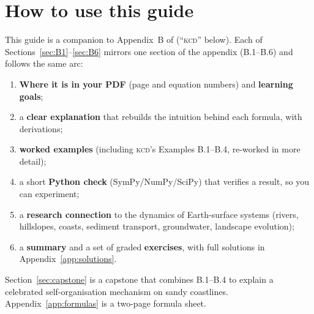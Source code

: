 \documentclass[11pt,letterpaper]{article}
\numberwithin{equation}{section}
\newcommand{\Kundu}{\textnormal{\textsc{kcd}}}   %
\begin{document}
\section*{How to use this guide}

This guide is a companion to Appendix~B of \citet{kundu2016} (``\Kundu'' below). Each of
Sections~\ref{sec:B1}--\ref{sec:B6} mirrors one section of the appendix (B.1--B.6) and follows the same arc:
\begin{enumerate}[label=\arabic*.,leftmargin=2em]
  \item \textbf{Where it is in your PDF} (page and equation numbers) and \textbf{learning goals};
  \item a \textbf{clear explanation} that rebuilds the intuition behind each formula, with derivations;
  \item \textbf{worked examples} (including \Kundu's Examples B.1--B.4, re-worked in more detail);
  \item a short \textbf{Python check} (SymPy/NumPy/SciPy) that verifies a result, so you can experiment;
  \item a \textbf{research connection} to the dynamics of Earth-surface systems (rivers, hillslopes,
        coasts, sediment transport, groundwater, landscape evolution);
  \item a \textbf{summary} and a set of graded \textbf{exercises}, with full solutions in Appendix~\ref{app:solutions}.
\end{enumerate}
Section~\ref{sec:capstone} is a capstone that combines B.1--B.4 to explain a celebrated
self-organisation mechanism on sandy coastlines. Appendix~\ref{app:formulas} is a two-page formula sheet.
\end{document}
